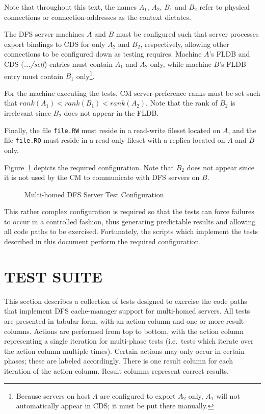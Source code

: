Note that throughout this text, the names $A_{1}$, $A_{2}$, $B_{1}$
and $B_{2}$ refer to physical connections or connection-addresses as the
context dictates.

The DFS server machines $A$ and $B$ must be configured such that server
processes export bindings to CDS for only $A_{2}$ and $B_{2}$, respectively,
allowing other connections to be configured down as testing
requires.
Machine $A$'s FLDB and CDS (\mbox{\em.../self}) entries must
contain $A_{1}$ and $A_{2}$ only, while machine $B$'s FLDB entry
must contain $B_{1}$ only\footnote{Because servers on host $A$ are
configured to export $A_{2}$ only, $A_{1}$ will not automatically appear
in CDS; it must be put there manually.}.

For the machine executing the tests, CM server-preference ranks
must be set such that
$rank(A_{1}) < rank(B_{1}) < rank(A_{2})$.
Note that the rank of $B_{2}$ is irrelevant since $B_{2}$ does not
appear in the FLDB.

Finally, the file {\tt file.RW} must reside in a read-write fileset
located on $A$, and the file {\tt file.RO} must reside in a read-only
fileset with a replica located on $A$ and $B$ only.

Figure~\ref{fig:config} depicts the required configuration.
Note that $B_{2}$ does not appear since it is not used by the CM
to communicate with DFS servers on $B$.

\begin{figure}
\begin{center}
\leavevmode{}
\caption{Multi-homed DFS Server Test Configuration}
\label{fig:config}
\end{center}
\end{figure}

This rather complex configuration is required so that the tests can
force failures to occur in a controlled fashion, thus generating predictable
results and allowing all code paths to be exercised.
Fortunately, the scripts which implement the tests described in
this document perform the required configuration.



%
%

\section{TEST SUITE}
\label{sec:suite}

This section describes a collection of tests designed to exercise the
code paths that implement DFS cache-manager support for multi-homed servers.
All tests are presented in tabular form, with an action column and
one or more result columns.  Actions are performed from top to
bottom, with the action column representing a single iteration for
multi-phase tests (i.e.\ tests which iterate over the action column
multiple times).  Certain actions may only occur in certain phases; these
are labeled accordingly.  There is one result column for each iteration of
the action column.  Result columns represent correct results.

